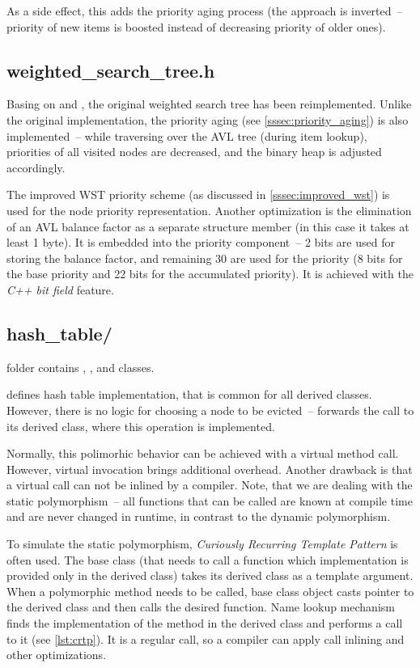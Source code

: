 As a side effect, this adds the priority aging process (the approach is inverted~-- priority of new items is boosted instead of decreasing priority of older ones).

\subsection{weighted\_search\_tree.h}
Basing on \cite{park90} and \cite{park94}, the original weighted search tree has been reimplemented. Unlike the original implementation, the priority aging (see \cref{sssec:priority_aging}) is also implemented~-- while traversing over the AVL tree (during item lookup), priorities of all visited nodes are decreased, and the binary heap is adjusted accordingly.

The improved WST priority scheme (as discussed in \cref{sssec:improved_wst}) is used for the node priority representation. Another optimization is the elimination of an AVL balance factor as a separate structure member (in this case it takes at least 1 byte). It is embedded into the priority component~-- 2 bits are used for storing the balance factor, and remaining 30 are used for the priority (8 bits for the base priority and 22 bits for the accumulated priority). It is achieved with the \emph{C++ bit field} feature.

\subsection{hash\_table/}

 folder contains , , and  classes.

 defines hash table implementation, that is common for all derived classes. However, there is no logic for choosing a node to be evicted~--  forwards the call to its derived class, where this operation is implemented.

Normally, this polimorhic behavior can be achieved with a virtual method call. However, virtual invocation brings additional overhead. Another drawback is that a virtual call can not be inlined by a compiler. Note, that we are dealing with the static polymorphism~-- all functions that can be called are known at compile time and are never changed in runtime, in contrast to the dynamic polymorphism.

To simulate the static polymorphism, \emph{Curiously Recurring Template Pattern} is often used\cite{crtp}. The base class (that needs to call a function which implementation is provided only in the derived class) takes its derived class as a template argument. When a polymorphic method needs to be called, base class object casts  pointer to the derived class and then calls the desired function. Name lookup mechanism finds the implementation of the method in the derived class and performs a call to it (see \cref{lst:crtp}). It is a regular call, so a compiler can apply call inlining and other optimizations.

